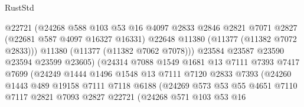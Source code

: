 \begin{lexlean}{RustStd}
\begin{coremodule}
                                @22721
                                (@24268
                                  @588
                                  @103
                                  @53
                                  @16
                                  @4097
                                  @2833
                                  @2846
                                  @2821
                                  @7071
                                  @2827
                                  (@22681 @587 @4097 @16327 @16331)
                                  @22648
                                  @11380
                                  (@11377 (@11382 @7072 @2833)))
                                @11380
                                (@11377 (@11382 @7062 @7078)))
                              @23584
                              @23587
                              @23590
                              @23594
                              @23599
                              @23605)
                            (@24314
                              @7088
                              @1549
                              @1681
                              @13
                              @7111
                              @7393
                              @7417
                              @7699
                              (@24249
                                @1444
                                @1496
                                @1548
                                @13
                                @7111
                                @7120
                                @2833
                                @7393
                                (@24260
                                  @1443
                                  @489
                                  @19158
                                  @7111
                                  @7118
                                  @6188
                                  (@24269
                                    @573
                                    @53
                                    @55
                                    @4651
                                    @7110
                                    @7117
                                    @2821
                                    @7093
                                    @2827
                                    @22721
                                    (@24268
                                      @571
                                      @103
                                      @53
                                      @16

\end{coremodule}
\end{lexlean}
